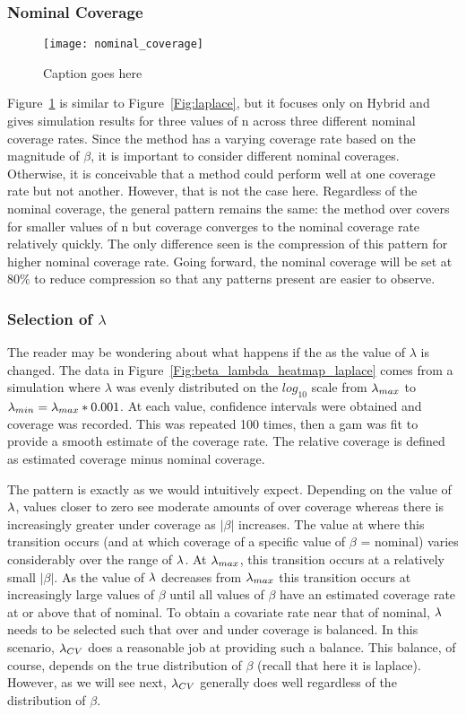 \subsubsection{Nominal Coverage}

\begin{figure}
  \texttt{[image: nominal\_coverage]}
  \caption{\label{Fig:nominal_coverage} Caption goes here}
\end{figure}

Figure~\ref{Fig:nominal_coverage} is similar to Figure~\ref{Fig:laplace}, but it focuses only on Hybrid and gives simulation results for three values of n across three different nominal coverage rates. Since the method has a varying coverage rate based on the magnitude of $\beta$, it is important to consider different nominal coverages. Otherwise, it is conceivable that a method could perform well at one coverage rate but not another. However, that is not the case here. Regardless of the nominal coverage, the general pattern remains the same: the method over covers for smaller values of n but coverage converges to the nominal coverage rate relatively quickly. The only difference seen is the compression of this pattern for higher nominal coverage rate. Going forward, the nominal coverage will be set at $80\%$ to reduce compression so that any patterns present are easier to observe.

\subsubsection{Selection of \texorpdfstring{$\lambda$}{lambda}}

The reader may be wondering about what happens if the as the value of $\lambda$ is changed. The data in Figure~\ref{Fig:beta_lambda_heatmap_laplace} comes from a simulation where $\lambda$ was evenly distributed on the $log_{10}$ scale from $\lambda_{max}$ to $\lambda_{min} = \lambda_{max} * 0.001$. At each value, confidence intervals were obtained and coverage was recorded. This was repeated 100 times, then a gam was fit to provide a smooth estimate of the coverage rate. The relative coverage is defined as estimated coverage minus nominal coverage.

The pattern is exactly as we would intuitively expect. Depending on the value of $\lambda$, values closer to zero see moderate amounts of over coverage whereas there is increasingly greater under coverage as $|\beta|$ increases. The value at where this transition occurs (and at which coverage of a specific value of $\beta$ = nominal) varies considerably over the range of $\lambda$. At $\lambda_{max}$, this transition occurs at a relatively small $|\beta|$. As the value of $\lambda$ decreases from $\lambda_{max}$ this transition occurs at increasingly large values of $\beta$ until all values of $\beta$ have an estimated coverage rate at or above that of nominal. To obtain a covariate rate near that of nominal, $\lambda$ needs to be selected such that over and under coverage is balanced. In this scenario, $\lambda_{CV}$ does a reasonable job at providing such a balance. This balance, of course, depends on the true distribution of $\beta$ (recall that here it is laplace). However, as we will see next, $\lambda_{CV}$ generally does well regardless of the distribution of $\beta$.

